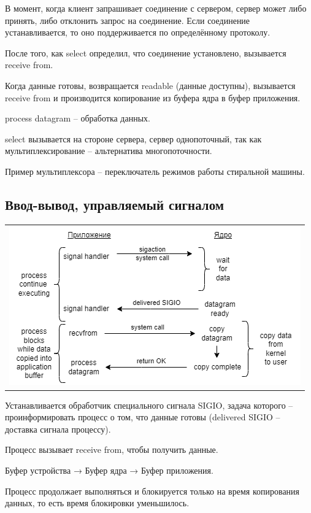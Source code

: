 В момент, когда клиент запрашивает соединение с сервером, сервер может либо принять, либо отклонить запрос на соединение. Если соединение устанавливается, то оно поддерживается по определённому протоколу.

После того, как select определил, что соединение установлено, вызывается receive from.

Когда данные готовы, возвращается readable (данные доступны), вызывается receive from и производится копирование из буфера ядра в буфер приложения.

process datagram – обработка данных.

select вызывается на стороне сервера, сервер однопоточный, так как мультиплексирование – альтернатива многопоточности.

Пример мультиплексора – переключатель режимов работы стиральной машины.

\subsection{Ввод-вывод, управляемый сигналом}

\begin{table}[H]
  \centering
  \begin{tabular}{p{1\linewidth}}
    \centering
    \includegraphics[width=0.8\linewidth]{./images/1-4.png}
  \end{tabular}
\end{table}

Устанавливается обработчик специального сигнала SIGIO, задача которого – проинформировать процесс о том, что данные готовы (delivered SIGIO – доставка сигнала процессу).

Процесс вызывает receive from, чтобы получить данные.

Буфер устройства → Буфер ядра → Буфер приложения.

Процесс продолжает выполняться и блокируется только на время копирования данных, то есть время блокировки уменьшилось.

